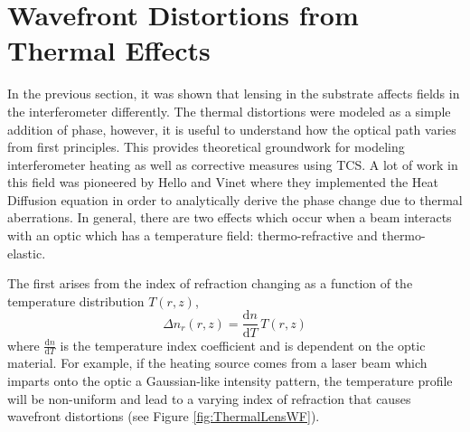 	\section{Wavefront Distortions from Thermal Effects}\label{sec:wf_dist}
	In the previous section, it was shown that lensing in the substrate affects fields in the interferometer differently.  The thermal distortions were modeled as a simple addition of phase, however, it is useful to understand how the optical path varies from first principles.  This provides theoretical groundwork for modeling interferometer heating as well as corrective measures using TCS.  A lot of work in this field was pioneered by Hello and Vinet \cite{hello_vinet} \cite{Vinet_Thermal_Issues} where they implemented the Heat Diffusion equation in order to analytically derive the phase change due to thermal aberrations.  In general, there are two effects which occur when a beam interacts with an optic which has a temperature field: thermo-refractive and thermo-elastic.  
	
	The first arises from the index of refraction changing as a function of the temperature distribution $T(r,z)$,
	\begin{equation}
	\Delta n_{r}(r,z) = \frac{\text{d}n}{\text{d}T} \, T(r,z)
	\end{equation}
	where $\frac{\text{d}n}{\text{d}T}$ is the temperature index coefficient and is dependent on the optic material.  For example, if the heating source comes from a laser beam which imparts onto the optic a Gaussian-like intensity pattern, the temperature profile will be non-uniform and lead to a varying index of refraction that causes wavefront distortions (see Figure \ref{fig:ThermalLensWF}).

